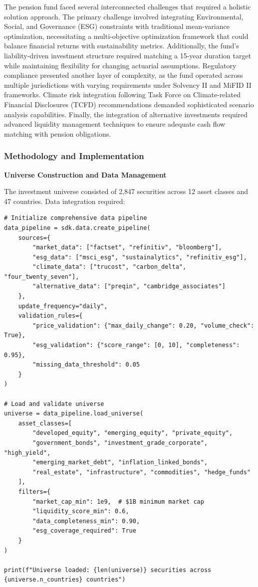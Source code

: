 \documentclass[12pt,a4paper]{article}
\theoremstyle{definition}
\theoremstyle{remark}
\begin{document}
The pension fund faced several interconnected challenges that required a holistic solution approach. The primary challenge involved integrating Environmental, Social, and Governance (ESG) constraints with traditional mean-variance optimization, necessitating a multi-objective optimization framework that could balance financial returns with sustainability metrics. Additionally, the fund's liability-driven investment structure required matching a 15-year duration target while maintaining flexibility for changing actuarial assumptions. Regulatory compliance presented another layer of complexity, as the fund operated across multiple jurisdictions with varying requirements under Solvency II and MiFID II frameworks. Climate risk integration following Task Force on Climate-related Financial Disclosures (TCFD) recommendations demanded sophisticated scenario analysis capabilities. Finally, the integration of alternative investments required advanced liquidity management techniques to ensure adequate cash flow matching with pension obligations.

\subsubsection{Methodology and Implementation}

\textbf{Universe Construction and Data Management}

The investment universe consisted of 2,847 securities across 12 asset classes and 47 countries. Data integration required:

\begin{lstlisting}[caption=Large-Scale Data Integration]
# Initialize comprehensive data pipeline
data_pipeline = sdk.data.create_pipeline(
    sources={
        "market_data": ["factset", "refinitiv", "bloomberg"],
        "esg_data": ["msci_esg", "sustainalytics", "refinitiv_esg"],
        "climate_data": ["trucost", "carbon_delta", "four_twenty_seven"],
        "alternative_data": ["preqin", "cambridge_associates"]
    },
    update_frequency="daily",
    validation_rules={
        "price_validation": {"max_daily_change": 0.20, "volume_check": True},
        "esg_validation": {"score_range": [0, 10], "completeness": 0.95},
        "missing_data_threshold": 0.05
    }
)

# Load and validate universe
universe = data_pipeline.load_universe(
    asset_classes=[
        "developed_equity", "emerging_equity", "private_equity",
        "government_bonds", "investment_grade_corporate", "high_yield",
        "emerging_market_debt", "inflation_linked_bonds",
        "real_estate", "infrastructure", "commodities", "hedge_funds"
    ],
    filters={
        "market_cap_min": 1e9,  # $1B minimum market cap
        "liquidity_score_min": 0.6,
        "data_completeness_min": 0.90,
        "esg_coverage_required": True
    }
)

print(f"Universe loaded: {len(universe)} securities across {universe.n_countries} countries")
\end{lstlisting}
\end{document}
